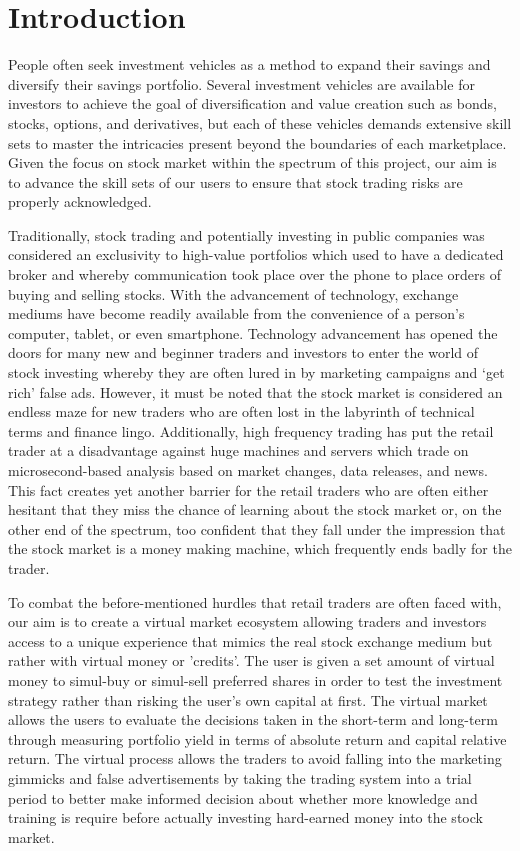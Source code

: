 
\section{Introduction}
    \label{sec:intro}

People often seek investment vehicles as a method to expand their savings and diversify their savings portfolio. Several investment vehicles are available for investors to achieve the goal of diversification and value creation such as bonds, stocks, options, and derivatives, but each of these vehicles demands extensive skill sets to master the intricacies present beyond the boundaries of each marketplace. Given the focus on stock market within the spectrum of this project, our aim is to advance the skill sets of our users to ensure that stock trading risks are properly acknowledged. 

Traditionally, stock trading and potentially investing in public companies was considered an exclusivity to high-value portfolios which used to have a dedicated broker and whereby communication took place over the phone to place orders of buying and selling stocks. With the advancement of technology, exchange mediums have become readily available from the convenience of a person's computer, tablet, or even smartphone. Technology advancement has opened the doors for many new and beginner traders and investors to enter the world of stock investing whereby they are often lured in by marketing campaigns and ‘get rich’ false ads. However, it must be noted that the stock market is considered an endless maze for new traders who are often lost in the labyrinth of technical terms and finance lingo. Additionally, high frequency trading has put the retail trader at a disadvantage against huge machines and servers which trade on microsecond-based analysis based on market changes, data releases, and news. This fact creates yet another barrier for the retail traders who are often either hesitant that they miss the chance of learning about the stock market or, on the other end of the spectrum, too confident that they fall under the impression that the stock market is a money making machine, which frequently ends badly for the trader.

To combat the before-mentioned hurdles that retail traders are often faced with, our aim is to create a virtual market ecosystem allowing traders and investors access to  a unique experience that mimics the real stock exchange medium but rather with virtual money or 'credits'. The user is given a set amount of virtual money to simul-buy or simul-sell preferred shares in order to test the investment strategy rather than risking the user’s own capital at first. The virtual market allows the users to evaluate the decisions taken in the short-term and long-term through measuring portfolio yield in terms of absolute return and capital relative return. The virtual process allows the traders to avoid falling into the marketing gimmicks and false advertisements by taking the trading system into a trial period to better make informed decision about whether more knowledge and training is require before actually investing hard-earned money into the stock market.
